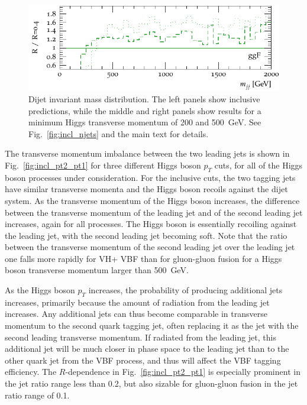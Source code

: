 \documentclass[10pt,prd,fleqn,superscriptaddress,notitlepage,nofootinbib,preprintnumbers,nobalancelastpage]{revtex4-1}
\newcommand{\VBF}{VBF\xspace}
\newcommand{\VH}{VH\xspace}
\begin{document}
\begin{figure}[p]
\begin{minipage}{.2925\textwidth}
    \includegraphics[width=\textwidth]{figures/channels/m_jj12_pth500_rGGH.pdf}
  \end{minipage}\hfill
\caption{Dijet invariant mass distribution. The left panels show inclusive predictions,
while the middle and right panels show results for a minimum Higgs transverse momentum of 200 and 500~GeV.
See Fig.~\ref{fig:incl_njets} and the main text for details.}
\label{fig:incl_m_jj12}
\end{figure}
The transverse momentum imbalance between the two leading jets is shown in Fig.~\ref{fig:incl_pt2_pt1} for three different Higgs boson $p_T$ cuts, for all of the Higgs boson processes under consideration.
For the inclusive cuts, the two tagging jets have similar transverse momenta and the Higgs boson recoils against the dijet system. As the transverse momentum of the Higgs boson increases, the difference between the transverse momentum of the leading jet and of the second leading jet increases, again for all processes. The Higgs boson is essentially recoiling against the leading jet, with the second leading jet becoming soft. Note that the ratio between the transverse momentum of the second leading jet over the leading jet one falls more rapidly for \VH + \VBF than for gluon-gluon fusion for a Higgs boson transverse momentum larger than 500~GeV.

As the Higgs boson $p_T$ increases, the probability of producing additional jets increases, primarily because the amount of radiation from the leading jet increases.
Any additional jets can thus become comparable in transverse momentum to the second quark tagging jet, often replacing it as the jet with the second leading transverse momentum. If radiated from the leading jet, this additional jet will be much closer in phase space to the leading jet than to the other quark jet from the \VBF process, and thus will affect the \VBF tagging efficiency. The $R$-dependence in Fig.~\ref{fig:incl_pt2_pt1} is especially prominent in the jet ratio range less than 0.2, but also sizable for gluon-gluon fusion in the jet ratio range of 0.1.
\end{document}
